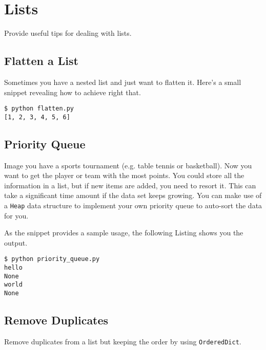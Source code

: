 
\section{Lists}

Provide useful tips for dealing with lists.


\subsection{Flatten a List}

Sometimes you have a nested list and just want to flatten it.
Here's a small snippet revealing how to achieve right that.



\begin{lstlisting}[caption=Output of flatten.py]
$ python flatten.py
[1, 2, 3, 4, 5, 6]
\end{lstlisting}


\subsection{Priority Queue}

Image you have a sports tournament (e.g. table tennis or basketball).
Now you want to get the player or team with the most points.
You could store all the information in a list, but if new items are added, you need to resort it.
This can take a significant time amount if the data set keeps growing.
You can make use of a \lstinline{Heap} data structure to implement your own priority queue to auto-sort the data for you.



As the snippet provides a sample usage, the following Listing shows you the output.

\begin{lstlisting}[caption=Output of priority\_queue.py]
$ python priority_queue.py
hello
None
world
None
\end{lstlisting}


\subsection{Remove Duplicates}

Remove duplicates from a list but keeping the order by using \lstinline{OrderedDict}.

